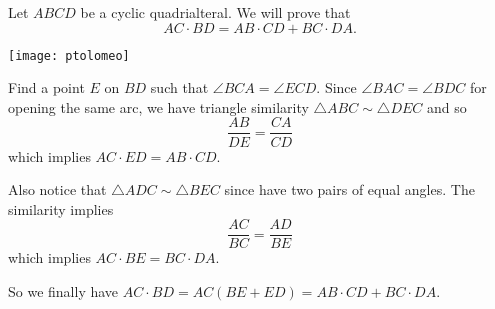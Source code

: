 \documentclass[12pt]{article}
\begin{document}
Let $ABCD$ be a cyclic quadrialteral. We will prove that 
$$AC\cdot BD=AB\cdot CD + BC\cdot DA.$$

\begin{center}
\texttt{[image: ptolomeo]}
\end{center}

Find a point $E$ on $BD$ such that $\angle BCA=\angle ECD$. Since $\angle BAC=\angle BDC$ for opening the same arc, we have triangle similarity
$\triangle ABC\sim \triangle DEC$ and so
$$\frac{AB}{DE}=\frac{CA}{CD}$$
which implies $AC\cdot ED = AB\cdot CD$.

Also notice that $\triangle ADC \sim \triangle BEC$ since have two pairs of equal angles. The similarity implies 
$$\frac{AC}{BC}=\frac{AD}{BE}$$
which implies $AC\cdot BE = BC\cdot DA$.

So we finally have $AC\cdot BD=AC(BE+ED)=AB\cdot CD+BC\cdot DA$.
\end{document}
